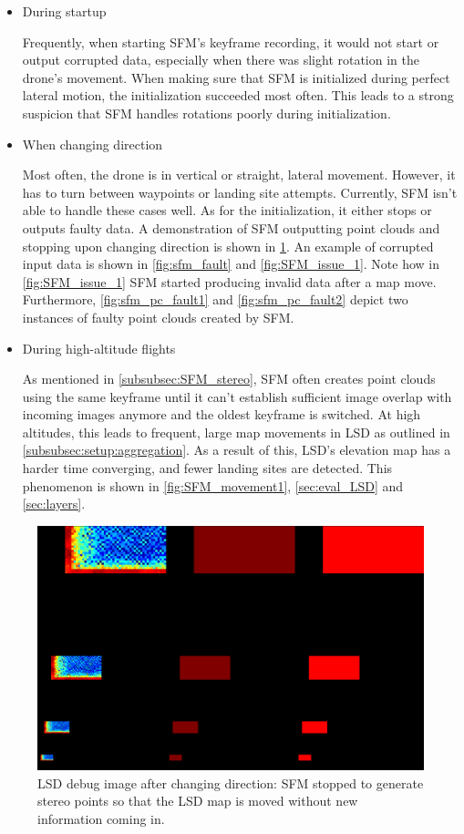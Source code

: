 \begin{itemize}
    \item During startup

    Frequently, when starting SFM's keyframe recording, it would not start or output corrupted data, especially when there was slight rotation in the drone's movement. When making sure that SFM is initialized during perfect lateral motion, the initialization succeeded most often. This leads to a strong suspicion that SFM handles rotations poorly during initialization.
    \item When changing direction

    Most often, the drone is in vertical or straight, lateral movement. However, it has to turn between waypoints or landing site attempts. Currently, SFM isn't able to handle these cases well. As for the initialization, it either stops or outputs faulty data. A demonstration of SFM outputting point clouds and stopping upon changing direction is shown in \cref{fig:sfm_stop}. An example of corrupted input data is shown in \cref{fig:sfm_fault} and \cref{fig:SFM_issue_1}. Note how in \cref{fig:SFM_issue_1} SFM started producing invalid data after a map move. Furthermore, \cref{fig:sfm_pc_fault1} and \cref{fig:sfm_pc_fault2} depict two instances of faulty point clouds created by SFM.
    \item During high-altitude flights
    
    As mentioned in \cref{subsubsec:SFM_stereo}, SFM often creates point clouds using the same keyframe until it can't establish sufficient image overlap with incoming images anymore and the oldest keyframe is switched. At high altitudes, this leads to frequent, large map movements in LSD as outlined in \cref{subsubsec:setup:aggregation}. As a result of this, LSD's elevation map has a harder time converging, and fewer landing sites are detected. This phenomenon is shown in \cref{fig:SFM_movement1}, \cref{sec:eval_LSD} and \cref{sec:layers}.
\end{itemize}

\begin{figure}[h]
    \centering
    \includegraphics[scale=0.25]{images/evaluation/SFM_issues/sfm_stopped.png}
    \caption{LSD debug image after changing direction: SFM stopped to generate stereo points so that the LSD map is moved without new information coming in.}
    \label{fig:sfm_stop}
\end{figure}

